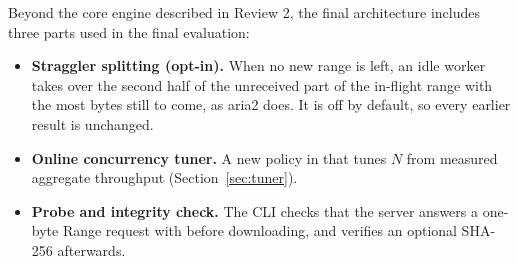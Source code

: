 Beyond the core engine described in Review 2, the final architecture includes three parts used in the final evaluation:
\begin{itemize}
\item \textbf{Straggler splitting (opt-in).} When no new range is left, an idle worker takes over the second half of the unreceived part of the in-flight range with the most bytes still to come, as aria2 does. It is off by default, so every earlier result is unchanged.
\item \textbf{Online concurrency tuner.} A new policy in  that tunes $N$ from measured aggregate throughput (Section~\ref{sec:tuner}).
\item \textbf{Probe and integrity check.} The CLI checks that the server answers a one-byte Range request with  before downloading, and verifies an optional SHA-256 afterwards.
\end{itemize}


